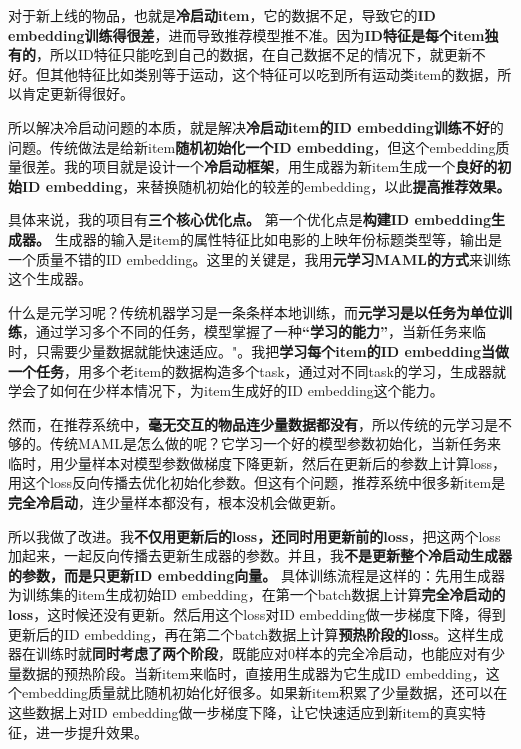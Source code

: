\documentclass[UTF8]{ctexart}
\begin{document}
对于新上线的物品，也就是\textbf{冷启动item}，它的数据不足，导致它的\textbf{ID embedding训练得很差}，进而导致推荐模型推不准。因为\textbf{ID特征是每个item独有的}，所以ID特征只能吃到自己的数据，在自己数据不足的情况下，就更新不好。但其他特征比如类别等于运动，这个特征可以吃到所有运动类item的数据，所以肯定更新得很好。

所以解决冷启动问题的本质，就是解决\textbf{冷启动item的ID embedding训练不好}的问题。传统做法是给新item\textbf{随机初始化一个ID embedding}，但这个embedding质量很差。我的项目就是设计一个\textbf{冷启动框架}，用生成器为新item生成一个\textbf{良好的初始ID embedding}，来替换随机初始化的较差的embedding，以此\textbf{提高推荐效果。}

具体来说，我的项目有\textbf{三个核心优化点。} 第一个优化点是\textbf{构建ID embedding生成器。} 生成器的输入是item的属性特征比如电影的上映年份标题类型等，输出是一个质量不错的ID embedding。这里的关键是，我用\textbf{元学习MAML的方式}来训练这个生成器。

什么是元学习呢？传统机器学习是一条条样本地训练，而\textbf{元学习是以任务为单位训练}，通过学习多个不同的任务，模型掌握了一种\textbf{“学习的能力”}，当新任务来临时，只需要少量数据就能快速适应。"。我把\textbf{学习每个item的ID embedding当做一个任务}，用多个老item的数据构造多个task，通过对不同task的学习，生成器就学会了如何在少样本情况下，为item生成好的ID embedding这个能力。

然而，在推荐系统中，\textbf{毫无交互的物品连少量数据都没有}，所以传统的元学习是不够的。传统MAML是怎么做的呢？它学习一个好的模型参数初始化，当新任务来临时，用少量样本对模型参数做梯度下降更新，然后在更新后的参数上计算loss，用这个loss反向传播去优化初始化参数。但这有个问题，推荐系统中很多新item是\textbf{完全冷启动}，连少量样本都没有，根本没机会做更新。

所以我做了改进。我\textbf{不仅用更新后的loss，还同时用更新前的loss}，把这两个loss加起来，一起反向传播去更新生成器的参数。并且，我\textbf{不是更新整个冷启动生成器的参数，而是只更新ID embedding向量。} 具体训练流程是这样的：先用生成器为训练集的item生成初始ID embedding，在第一个batch数据上计算\textbf{完全冷启动的loss}，这时候还没有更新。然后用这个loss对ID embedding做一步梯度下降，得到更新后的ID embedding，再在第二个batch数据上计算\textbf{预热阶段的loss}。这样生成器在训练时就\textbf{同时考虑了两个阶段}，既能应对0样本的完全冷启动，也能应对有少量数据的预热阶段。当新item来临时，直接用生成器为它生成ID embedding，这个embedding质量就比随机初始化好很多。如果新item积累了少量数据，还可以在这些数据上对ID embedding做一步梯度下降，让它快速适应到新item的真实特征，进一步提升效果。
\end{document}
